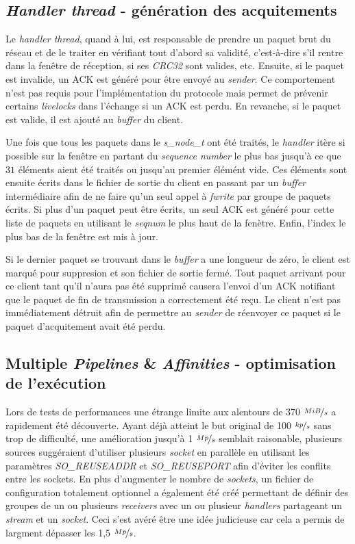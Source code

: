 \documentclass[../main.tex]{subfiles}
\begin{document}
\subsection{\textit{Handler thread} - génération des acquitements}
\label{sec:handler}

Le \textit{handler thread}, quand à lui, est responsable de prendre un paquet brut du réseau et de le traiter en vérifiant tout 
d'abord sa validité, c'est-à-dire s'il rentre dans la fenêtre de réception, si ses \textit{CRC32} sont valides, etc. Ensuite, si le paquet
est invalide, un ACK est généré pour être envoyé au \textit{sender}. Ce comportement n'est pas requis pour l'implémentation du protocole mais permet 
de prévenir certains \textit{livelocks} dans l'échange si un ACK est perdu. En revanche, si le paquet est valide, il est ajouté au \textit{buffer} 
du client.

Une fois que tous les paquets dans le \textit{s\_node\_t} ont été traités, le \textit{handler} itère si possible sur la fenêtre en partant 
du \textit{sequence number} le plus bas jusqu'à ce que $31$ éléments aient été traités ou jusqu'au premier élémént vide. Ces éléments sont ensuite
écrits dans le fichier de sortie du client en passant par un \textit{buffer} intermédiaire afin de ne faire qu'un seul appel à \textit{fwrite}
par groupe de paquets écrits. Si plus d'un paquet peut être écrits, un seul ACK est généré pour cette liste de paquets en utilisant le \textit{seqnum}
le plus haut de la fenètre. Enfin, l'index le plus bas de la fenêtre est mis à jour.

Si le dernier paquet se trouvant dans le \textit{buffer} a une longueur de zéro, le client est marqué pour suppresion et son fichier de sortie
fermé. Tout paquet arrivant pour ce client tant qu'il n'aura pas été supprimé causera l'envoi d'un ACK notifiant que le paquet de fin de transmission
a correctement été reçu. Le client n'est pas immédiatement détruit afin de permettre au \textit{sender} de réenvoyer ce paquet si le
paquet d'acquitement avait été perdu.

\subsection{Multiple \textit{Pipelines} \& \textit{Affinities} - optimisation de l'exécution}
\label{sec:pipelines}

Lors de tests de performances une étrange limite aux alentours de 370 $\nicefrac{MiB}{s}$ a rapidement été découverte. Ayant déjà atteint 
le but original de 100 $\nicefrac{kp}{s}$ sans trop de difficulté, une amélioration jusqu'à 1 $\nicefrac{Mp}{s}$ semblait raisonable, plusieurs sources\cite{that_awesome_paper,1mmps_article}
suggéraient d'utiliser plusieurs \textit{socket} en parallèle en utilisant les paramètres \textit{SO\_REUSEADDR} et \textit{SO\_REUSEPORT} afin d'éviter
les conflits entre les sockets. En plus d'augmenter le nombre de \textit{sockets}, un fichier de configuration totalement optionnel a également été créé
permettant de définir des groupes de un ou plusieurs \textit{receivers} avec un ou plusieur \textit{handlers} partageant un \textit{stream} et un \textit{socket}.
Ceci s'est avéré être une idée judicieuse car cela a permis de largment dépasser les 1,5 $\nicefrac{Mp}{s}$.
\end{document}
